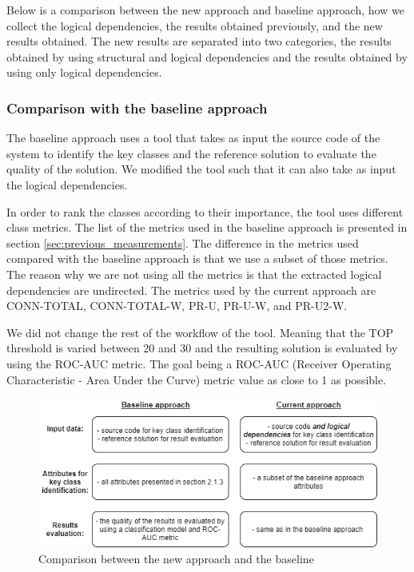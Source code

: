 \documentclass[12pt]{mitthesis}
\begin{document}
Below is a comparison between the new approach and baseline approach, how we collect the logical dependencies, the results obtained previously, and the new results obtained. 
The new results are separated into two categories, the results obtained by using structural and logical dependencies and the results obtained by using only logical dependencies. 



\subsubsection{Comparison with the baseline approach}
The baseline approach uses a tool that takes as input the source code of the system to identify the key classes and the reference solution to evaluate the quality of the solution. 
We modified the tool such that it can also take as input the logical dependencies. 

In order to rank the classes according to their importance, the tool uses different class metrics. The list of the metrics used in the baseline approach is presented in section \ref{sec:previous_measurements}.  
The difference in the metrics used compared with the baseline approach is that we use a subset of those metrics. The reason why we are not using all the metrics is that the extracted logical dependencies are undirected. The metrics used by the current approach are CONN-TOTAL, CONN-TOTAL-W, PR-U, PR-U-W, and PR-U2-W.

We did not change the rest of the workflow of the tool. Meaning that the TOP threshold is varied between 20 and 30 and the resulting solution is evaluated by using the ROC-AUC metric. The goal being a ROC-AUC (Receiver Operating Characteristic - Area Under the Curve) metric value as close to 1 as possible.

\begin{figure}[H]
\centering
\includegraphics[width=\textwidth]{baseline_comparison.png}
\caption{ Comparison between the new approach and the baseline }
\label{fig:baseline_comparison}
\centering
\end{figure}
\end{document}
